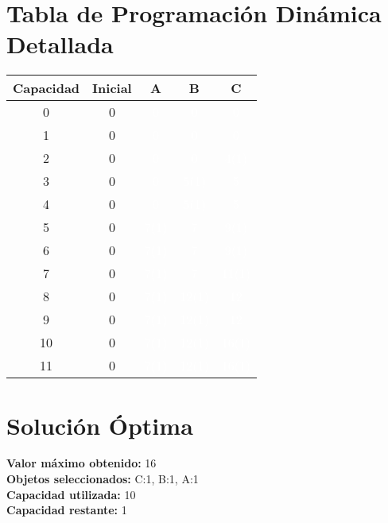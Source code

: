 \documentclass{article}
\begin{document}
\section*{Tabla de Programación Dinámica Detallada}
\begin{center}
\scriptsize
\begin{tabular}{|c|c|c|c|c|}
\hline
Capacidad & Inicial & A & B & C \\ \hline
0 & 0 & \cellcolor{rojo}\textcolor{white}{0} & \cellcolor{rojo}\textcolor{white}{0} & \cellcolor{rojo}\textcolor{white}{0} \\ \hline
1 & 0 & \cellcolor{rojo}\textcolor{white}{0} & \cellcolor{rojo}\textcolor{white}{0} & \cellcolor{rojo}\textcolor{white}{0} \\ \hline
2 & 0 & \cellcolor{rojo}\textcolor{white}{0} & \cellcolor{rojo}\textcolor{white}{0} & \cellcolor{verde}\textcolor{white}{4(1)} \\ \hline
3 & 0 & \cellcolor{rojo}\textcolor{white}{0} & \cellcolor{verde}\textcolor{white}{5(1)} & \cellcolor{rojo}\textcolor{white}{5} \\ \hline
4 & 0 & \cellcolor{rojo}\textcolor{white}{0} & \cellcolor{verde}\textcolor{white}{5(1)} & \cellcolor{rojo}\textcolor{white}{5} \\ \hline
5 & 0 & \cellcolor{verde}\textcolor{white}{7(1)} & \cellcolor{rojo}\textcolor{white}{7} & \cellcolor{verde}\textcolor{white}{9(1)} \\ \hline
6 & 0 & \cellcolor{verde}\textcolor{white}{7(1)} & \cellcolor{rojo}\textcolor{white}{7} & \cellcolor{verde}\textcolor{white}{9(1)} \\ \hline
7 & 0 & \cellcolor{verde}\textcolor{white}{7(1)} & \cellcolor{rojo}\textcolor{white}{7} & \cellcolor{verde}\textcolor{white}{11(1)} \\ \hline
8 & 0 & \cellcolor{verde}\textcolor{white}{7(1)} & \cellcolor{verde}\textcolor{white}{12(1)} & \cellcolor{rojo}\textcolor{white}{12} \\ \hline
9 & 0 & \cellcolor{verde}\textcolor{white}{7(1)} & \cellcolor{verde}\textcolor{white}{12(1)} & \cellcolor{rojo}\textcolor{white}{12} \\ \hline
10 & 0 & \cellcolor{verde}\textcolor{white}{7(1)} & \cellcolor{verde}\textcolor{white}{12(1)} & \cellcolor{verde}\textcolor{white}{16(1)} \\ \hline
11 & 0 & \cellcolor{verde}\textcolor{white}{7(1)} & \cellcolor{verde}\textcolor{white}{12(1)} & \cellcolor{verde}\textcolor{white}{16(1)} \\ \hline
\end{tabular}
\end{center}
\normalsize

\section*{Solución Óptima}
\textbf{Valor máximo obtenido:} 16\\
\textbf{Objetos seleccionados:} C:1, B:1, A:1\\
\textbf{Capacidad utilizada:} 10\\
\textbf{Capacidad restante:} 1\\
\end{document}
